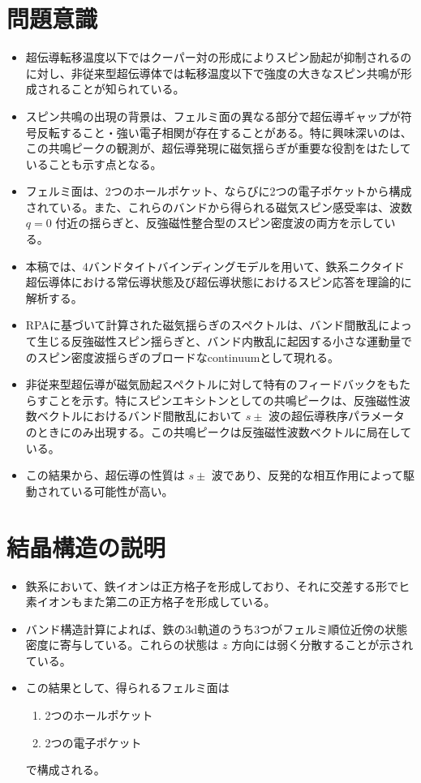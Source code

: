 \documentclass[a4paper,12pt]{article}
\begin{document}
\begin{CJK}{UTF8}{min}
\section*{問題意識}
\begin{itemize}
    \item 超伝導転移温度以下ではクーパー対の形成によりスピン励起が抑制されるのに対し、非従来型超伝導体では転移温度以下で強度の大きなスピン共鳴が形成されることが知られている。
    \item スピン共鳴の出現の背景は、フェルミ面の異なる部分で超伝導ギャップが符号反転すること・強い電子相関が存在することがある。特に興味深いのは、この共鳴ピークの観測が、超伝導発現に磁気揺らぎが重要な役割をはたしていることも示す点となる。
    \item フェルミ面は、2つのホールポケット、ならびに2つの電子ポケットから構成されている。また、これらのバンドから得られる磁気スピン感受率は、波数 \( q=0 \) 付近の揺らぎと、反強磁性整合型のスピン密度波の両方を示している。
    \item 本稿では、4バンドタイトバインディングモデルを用いて、鉄系ニクタイド超伝導体における常伝導状態及び超伝導状態におけるスピン応答を理論的に解析する。
    \item RPAに基づいて計算された磁気揺らぎのスペクトルは、バンド間散乱によって生じる反強磁性スピン揺らぎと、バンド内散乱に起因する小さな運動量でのスピン密度波揺らぎのブロードなcontinuumとして現れる。
    \item 非従来型超伝導が磁気励起スペクトルに対して特有のフィードバックをもたらすことを示す。特にスピンエキシトンとしての共鳴ピークは、反強磁性波数ベクトルにおけるバンド間散乱において \( s\pm \) 波の超伝導秩序パラメータのときにのみ出現する。この共鳴ピークは反強磁性波数ベクトルに局在している。
    \item この結果から、超伝導の性質は \( s\pm \) 波であり、反発的な相互作用によって駆動されている可能性が高い。
\end{itemize}

\section*{結晶構造の説明}
\begin{itemize}
    \item 鉄系において、鉄イオンは正方格子を形成しており、それに交差する形でヒ素イオンもまた第二の正方格子を形成している。
    \item バンド構造計算によれば、鉄の3d軌道のうち3つがフェルミ順位近傍の状態密度に寄与している。これらの状態は \( z \) 方向には弱く分散することが示されている。
    \item この結果として、得られるフェルミ面は
    \begin{enumerate}
        \item 2つのホールポケット
        \item 2つの電子ポケット
    \end{enumerate}
    で構成される。
\end{itemize}


\end{CJK}
\end{document}
